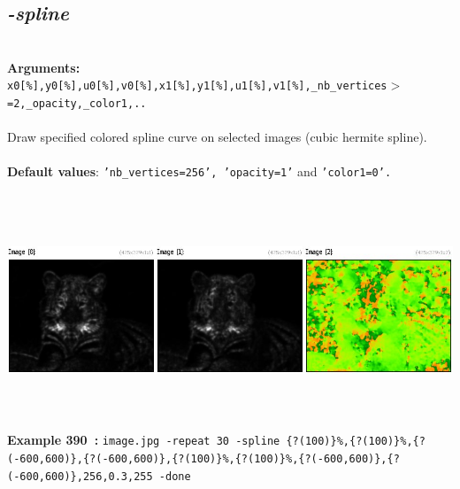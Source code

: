 \documentclass[a4paper,11pt,twoside]{book}
\begin{document}
\subsection{\emph{-spline} }\vspace*{-0.5em}
~\\\textbf{Arguments: } 
{\small \texttt{x0[\%],y0[\%],u0[\%],v0[\%],x1[\%],y1[\%],u1[\%],v1[\%],\_nb\_vertices$>$=2,\_opacity,\_color1,..}}\\~\\
Draw specified colored spline curve on selected images (cubic hermite spline).
~\\~\\\textbf{Default values}: {\small \texttt{'nb\_vertices=256', 'opacity=1'} and \texttt{'color1=0'.}}
\begin{center}\includegraphics[keepaspectratio=true,height=7cm,width=\textwidth]{img/gmic_def390.jpg}\\
{\footnotesize \textbf{Example 390~:} \texttt{image.jpg -repeat 30 -spline \{?(100)\}\%,\{?(100)\}\%,\{?(-600,600)\},\{?(-600,600)\},\{?(100)\}\%,\{?(100)\}\%,\{?(-600,600)\},\{?(-600,600)\},256,0.3,255 -done}}
\end{center}
\end{document}
